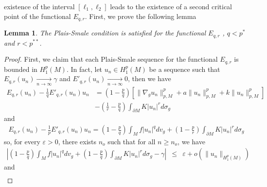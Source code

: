 \documentclass{Tran-l}
\newtheorem{lem}[thm]{Lemma}
\theoremstyle{definition}
\theoremstyle{remark}
\numberwithin{equation}{section}
\begin{document}
existence of the interval $\left[\ell_1,\ell_2\right]$ leads to the
existence of a second critical point of the functional $E_{q,r}$.
First, we prove the following lemma
\begin{lem}
The Plais-Smale condition is satisfied for the functional $E_{q,r}$
, $q<p^*$ and $ r<p^{**}$.
\end{lem}
\begin{proof} First, we claim that each Plais-Smale sequence for the functional $E_{q,r}$
is bounded in $H^p_1(M)$. In fact, let $u_n\in H^p_1(M)$ be a
sequence such that\\
$E_{q,r}(u_n)\underset{n\rightarrow\infty}\rightarrow \gamma$ and $
E'_{q,r}(u_n)\underset{n\rightarrow\infty}\rightarrow0$, then we
have
\begin{eqnarray*}
 
 E_{q,r}(u_n)-\frac{1}{q}E'_{q,r}(u_n)u_n&=
 \left(1-\frac{p}{q}\right)\left[\|\nabla_gu_n\|_{p,M}^p+a\|u_n\|_{p,M}^p+
k\|u_n\|_{p,M}^p\right]
  &\\
  &-\left(\frac{1}{r}-\frac{p}{q}\right)\int_{\partial M}K|u_n|^rd\sigma_g&
  \end{eqnarray*}
  and
\begin{eqnarray*}
 
E_{q,r}(u_n)-\frac{1}{p}E'_{q,r}(u_n)u_n=
\left(1-\frac{p}{q}\right)\int_Mf|u_n|^qdv_g+
\left(1-\frac{p}{r}\right)\int_{\partial M}K|u_n|^rd\sigma_g
\end{eqnarray*}
so, for every $\varepsilon>0$, there exists $n_o$ such that for all
$n\geq n_o$, we have
\begin{eqnarray*}
  \left|\left(1-\frac{p}{q}\right)\int_Mf|u_n|^qdv_g+
\left(1-\frac{p}{q}\right)\int_{\partial
M}K|u_n|^rd\sigma_g-\gamma\right| &\leq&
\varepsilon+o(\|u_n\|_{H^p_1(M)})
\end{eqnarray*}
and
\begin{eqnarray*}
 

\end{eqnarray*}
\end{proof}
\end{document}
